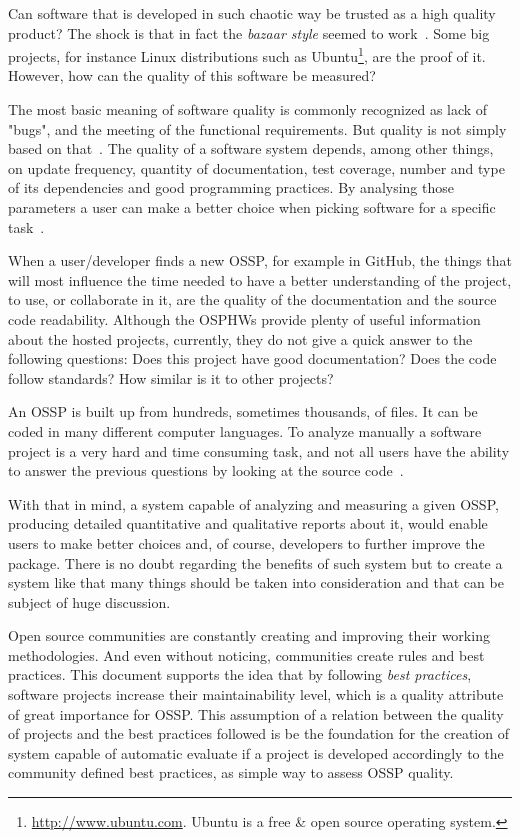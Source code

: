 Can software that is developed in such chaotic way be trusted as a high quality product?
The shock is that in fact the \textit{bazaar style} seemed to work~\cite{halloran2002high}.
Some big projects, for instance Linux distributions such as \textsf{Ubuntu}\footnote{\url{http://www.ubuntu.com}.
Ubuntu is a free \& open source operating system.},
are the proof of it.
However, how can the quality of this software be measured?

The most basic meaning of software quality is commonly recognized as lack of "bugs", and the meeting of the functional requirements.
But quality is not simply based on that~\cite{gousios2007software}.
The quality of a software system depends, among other things, on update frequency, quantity of documentation, test coverage,
number and type of its dependencies and good programming practices.
By analysing those parameters a user can make a better choice when picking software for a specific task~\cite{marchenko2007predicting}.

When a user/developer finds a new OSSP, for example in
GitHub, the things that will most influence the time needed to have a better understanding of the project, to use, or collaborate in it,
are the quality of the documentation and the source code readability.
Although the OSPHWs provide plenty of useful information about the hosted projects,
currently, they do not give a quick answer to the following questions:
Does this project have good documentation? Does the code follow standards? How similar is it to other projects?

An OSSP is built up from hundreds, sometimes thousands, of files. It can be coded in many different computer languages.
To  analyze manually a software project is a very hard and time consuming task,
and not all users have the ability to answer the previous questions by looking at the source code~\cite{crowston2003defining}.

With that in mind, a system capable of analyzing and measuring a given OSSP,
producing detailed quantitative and qualitative reports about it,
would enable users to make better choices and, of course, developers to further improve the package.
There is no doubt regarding the benefits of such system but
to create a system like that many things should be taken into consideration and 
that can be subject of huge discussion.

Open source communities are constantly creating and improving their working methodologies.
And even without noticing, communities create rules and best practices.
This document supports the idea that by following \emph{best practices}, 
software projects increase their maintainability level,
which is a quality attribute of great importance for OSSP.
This assumption of a relation between the quality of projects and the best practices followed
is be the foundation for the creation of system capable of automatic evaluate if a project 
is developed accordingly to the community defined best practices, 
as simple way to assess OSSP quality. 

